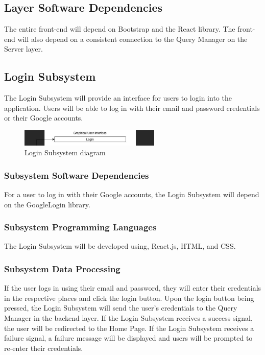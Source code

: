 \subsection{Layer Software Dependencies}
The entire front-end will depend on Bootstrap and the React library. The front-end will also depend on a consistent connection to the Query Manager on the Server layer.

\subsection{Login Subsystem}
The Login Subsystem will provide an interface for users to login into the application. Users will be able to log in with their email and password credentials or their Google accounts.

\begin{figure}[h!]
	\centering
 	\includegraphics[width=0.60\textwidth]{images/login}
 \caption{Login Subsystem diagram}
\end{figure}

\subsubsection{Subsystem Software Dependencies}
For a user to log in with their Google accounts, the Login Subsystem will depend on the GoogleLogin library.

\subsubsection{Subsystem Programming Languages}
The Login Subsystem will be developed using, React.js, HTML, and CSS.

\subsubsection{Subsystem Data Processing}
If the user logs in using their email and password, they will enter their credentials in the respective places and click the login button. Upon the login button being pressed, the Login Subsystem will send the user's credentials to the Query Manager in the backend layer. If the Login Subsystem receives a success signal, the user will be redirected to the Home Page. If the Login Subsystem receives a failure signal, a failure message will be displayed and users will be prompted to re-enter their credentials.

